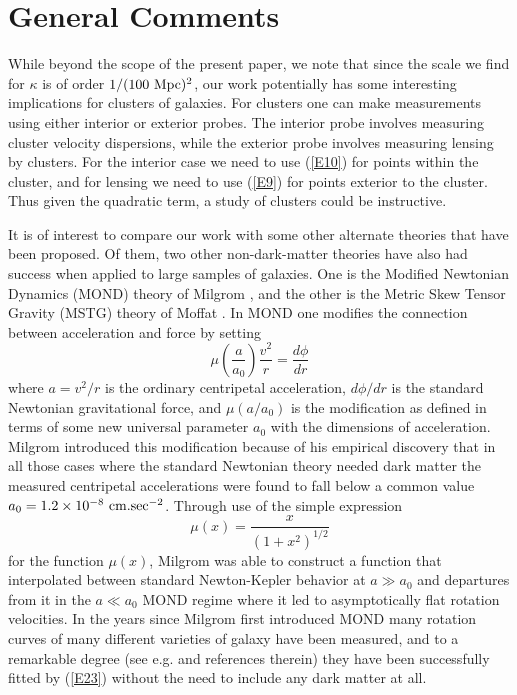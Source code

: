 \documentclass[preprint,aps]{revtex4}
\begin{document}
\section{General Comments}
\label{s5}

While beyond the scope of the present paper, we note that since the scale we find for $\kappa$ is of order $1/(100~{\rm Mpc})^2$, our work potentially has some interesting implications for clusters of galaxies. For clusters one can make measurements using either interior or exterior probes. The interior probe involves measuring cluster velocity dispersions, while the exterior probe involves measuring lensing by clusters. For the interior case we need to use (\ref{E10}) for points within the cluster, and for lensing we need to use (\ref{E9}) for points exterior to the cluster. Thus given the quadratic term,  a study of clusters could be instructive.

It is of interest to compare our work with some other  alternate theories that have been proposed. Of them, two other non-dark-matter theories have also had success when applied to large samples of galaxies. One is the Modified Newtonian Dynamics (MOND) theory of Milgrom \cite{Milgrom1983}, and the other is the Metric Skew Tensor Gravity (MSTG) theory of Moffat \cite{Moffat2005}. In MOND one modifies the connection between acceleration and force by setting
\begin{equation}
 \mu\left(\frac{a}{a_0}\right)\frac{v^2}{r}=\frac{d\phi}{dr}
\label{E22}
\end{equation}                                 
%
where $a=v^2/r$ is the ordinary centripetal acceleration, $d\phi/dr$ is the standard Newtonian gravitational force, and $\mu(a/a_0)$ is the modification as defined in terms of some new universal parameter $a_0$ with the dimensions of acceleration. Milgrom introduced this modification because of his empirical discovery that in all those cases where the standard Newtonian theory needed dark matter the measured centripetal accelerations were found to fall below a common value $a_0=1.2\times 10^{-8}~{\rm cm.sec}^{-2}$. Through use of the simple expression
%                                                                               
\begin{equation}
\mu(x)= \frac{x}{(1+x^2)^{1/2}}
\label{E23}
\end{equation}                                 
%
for the function $\mu(x)$, Milgrom was able to construct a function that interpolated between standard Newton-Kepler behavior at $a \gg a_0$ and departures from it in the $a \ll a_0$ MOND regime where it led to asymptotically flat rotation velocities. In the years since Milgrom first introduced MOND many rotation curves of many different varieties of galaxy have been measured, and to a remarkable degree (see e.g. \cite{Begeman1991,Sanders1996,Sanders1998,deBlok1998,Sanders2002} and references therein) they have been successfully fitted by (\ref{E23}) without the need to include any dark matter at all. 
\end{document}
